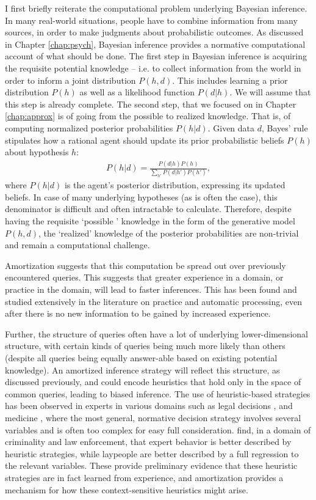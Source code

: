 I first briefly reiterate the computational problem underlying Bayesian inference. In many real-world situations, people have to combine information from many sources, in order to make judgments about probabilistic outcomes. As discussed in Chapter \ref{chap:psych}, Bayesian inference provides a normative computational account of what should be done. The first step in Bayesian inference is acquiring the requisite potential knowledge  -- i.e. to collect information from the world in order to inform a joint distribution $P(h,d)$. This includes learning a prior distribution $P(h)$ as well as a likelihood function $P(d | h)$. We will assume that this step is already complete. The second step, that we focused on in Chapter \ref{chap:approx} is of going from the possible to realized knowledge. That is, of computing normalized posterior probabilities  $P(h |d)$. Given data $d$, Bayes' rule stipulates how a rational agent should update its prior probabilistic beliefs $P(h)$ about hypothesis $h$:
\begin{align}
    P(h|d) = \frac{P(d|h)P(h)}{\sum_{h'} P(d|h') P(h')},
\end{align}
where $P(h|d)$ is the agent's posterior distribution, expressing its updated beliefs. In case of many underlying hypotheses (as is often the case), this denominator is difficult and often intractable to calculate. Therefore, despite having the requisite `possible ' knowledge in the form of the generative model $P(h,d)$, the `realized' knowledge of the posterior probabilities are non-trivial and remain a computational challenge.

Amortization suggests that this computation be spread out over previously encountered queries. This suggests that greater experience in a domain, or practice in the domain, will lead to faster inferences. This has been found and studied extensively in the literature on practice\citep{gobet2001chunking, newell1981mechanisms} and automatic processing\citep{shiffrin1977controlled, logan1988toward}, even after there is no new information to be gained by increased experience. 

Further, the structure of queries often have a lot of underlying lower-dimensional structure, with certain kinds of queries being much more likely than others (despite all queries being equally answer-able based on existing potential knowledge). An amortized inference strategy will reflect this structure, as discussed previously, and could encode heuristics that hold only in the space of common queries, leading to biased inference. The use of heuristic-based strategies has been observed in experts in various domains such as legal decisions \citep{dhami2001bailing}, and medicine \citep{reyna2006physician}, where the most general, normative decision strategy involves several variables and is often too complex for easy full consideration. \cite{garcia2009take} find, in a domain of criminality and law enforcement, that expert behavior is better described by heuristic strategies, while laypeople are better described by a full regression to the relevant variables. These provide preliminary evidence that these heuristic strategies are in fact learned from experience, and amortization provides a mechanism for how these context-sensitive heuristics might arise.

